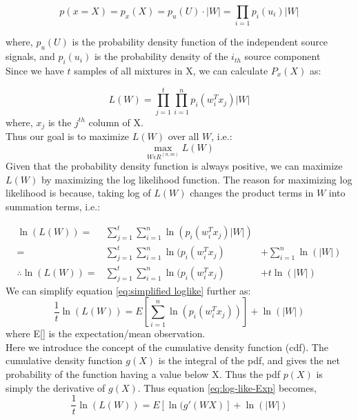 \documentclass[conference]{IEEEtran}
\begin{document}
\begin{equation}
    p(x=X) = p_x(X) = p_u(U)\cdot|W| = \prod_{i=1}p_i(u_i)|W|    
\end{equation}

where, $p_u(U)$ is the probability density function of the independent source signals, and $p_i(u_i)$ is the probability density of the $i_{th}$ source component\\

Since we have $t$ samples of all mixtures in X, we can calculate $P_x(X)$ as:


\begin{equation}
    L(W) = \prod_{j=1}^t\prod_{i=1}^np_i(w_i^Tx_j)|W|
    \label{eq:likelihood def}
\end{equation}
where, $x_j$ is the $j^{th}$ column of X.\\
Thus our goal is to maximize $L(W)$ over all $W$, i.e.:
\begin{equation}
    \max_{W\epsilon R^{(n,m)}} L(W)
    \label{eq:optimality-eqn}
\end{equation}
Given that the probability density function is always positive, we can maximize $L(W)$ by maximizing the log likelihood function. The reason for maximizing log likelihood is because, taking log of $L(W)$ changes the product terms in $W$ into summation terms, i.e.:

\begin{eqnarray}
    \ln{(L(W))} =& \sum_{j=1}^t\sum_{i=1}^n\ln{(p_i(w_i^Tx_j)|W|)}&\\
     =& \sum_{j=1}^t\sum_{i=1}^n\ln{(p_i(w_i^Tx_j)}& + \sum_{i=1}^n\ln(|W|)\\
     \therefore \ln{(L(W))} =& \sum_{j=1}^t\sum_{i=1}^n\ln{(p_i(w_i^Tx_j)}& + t\ln{(|W|)}
     \label{eq:simplified loglike}
\end{eqnarray}
We can simplify equation \ref{eq:simplified loglike} further as:
\begin{equation}
    \frac{1}{t}\ln{(L(W))} = E\left[\sum_{i=1}^n\ln{(p_i(w_i^Tx_j))}\right] + \ln{(|W|)}
    \label{eq:log-like-Exp}
\end{equation}
where E[] is the expectation/mean observation. \\
Here we introduce the concept of the cumulative density function (cdf). The cumulative density function $g(X)$ is the integral of the pdf, and gives the net probability of the function having a value below X. Thus the pdf $p(X)$ is simply the derivative of $g(X)$. Thus equation \ref{eq:log-like-Exp} becomes,\\
\begin{equation}
    \frac{1}{t}\ln{(L(W))} = E\left[\ln{(g'(WX)}\right] + \ln{(|W|)}
    \label{eq:log-like-Exp-cdf} 
\end{equation}
\end{document}
